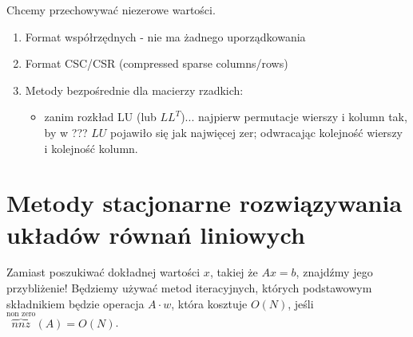 \documentclass[hidelinks,a4paper,fleqn,oneside]{book}
\begin{document}
Chcemy przechowywać niezerowe wartości.

\begin{enumerate}
	\item Format współrzędnych - nie ma żadnego uporządkowania
	      	
	\item Format CSC/CSR (compressed sparse columns/rows)
	      
	\item Metody bezpośrednie dla macierzy rzadkich:
	      \begin{itemize}
	      	\item zanim rozkład LU (lub $LL^T$)... najpierw permutacje wierszy i kolumn tak, by w ??? $LU$ pojawiło się jak najwięcej zer;
	      	      odwracając kolejność wierszy i kolejność kolumn.
	      \end{itemize}
\end{enumerate}


\section{Metody stacjonarne rozwiązywania układów równań liniowych}
Zamiast poszukiwać dokładnej wartości $x$, takiej że $Ax=b$, znajdźmy jego przybliżenie! Będziemy używać metod iteracyjnych, których podstawowym składnikiem będzie operacja $A \cdot w$, która kosztuje $O(N)$, jeśli $\overbrace{nnz}^{\textrm{non zero}}(A) = O(N)$.
\end{document}
